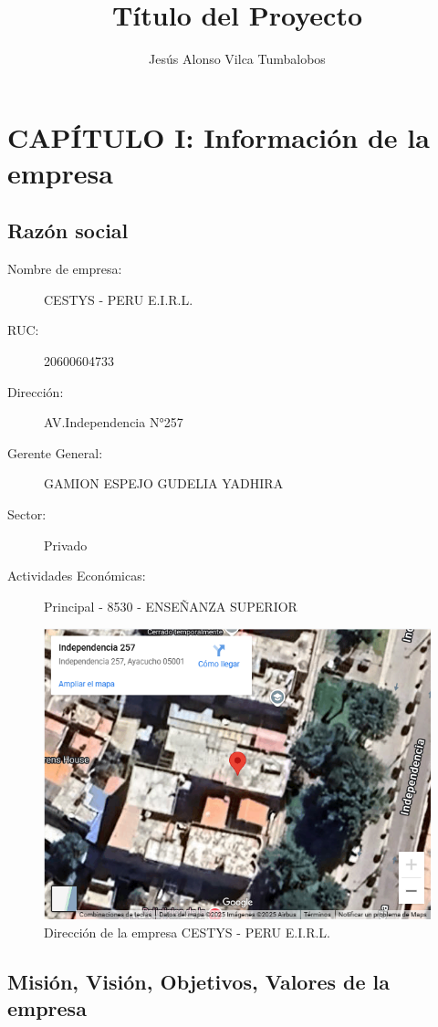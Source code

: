 \documentclass[stu, 12pt,letterpaper,donotrepeattitle,floatsintext,natbib]{apa7}
\title{Título del Proyecto}
\author{Jesús Alonso Vilca Tumbalobos}
\affiliation{Nombre de la Institución: SENATI}
\begin{document}
	
	\maketitle
	
	\tableofcontents %
	\newpage
	\section{CAPÍTULO I: Información de la empresa}
	
	\subsection{Razón social}
	
	\begin{description}
		\item[Nombre de empresa:] CESTYS - PERU E.I.R.L.
		\item[RUC:] 20600604733
		\item[Dirección:] AV.Independencia  N°257 
		\item[Gerente General:] GAMION ESPEJO GUDELIA YADHIRA
		\item[Sector:] Privado
		\item[Actividades Económicas:] Principal - 8530 - ENSEÑANZA SUPERIOR
	\end{description}
	\begin{figure}
		\centering
		\includegraphics[width=0.7\linewidth]{Figuras/11-08-08-2025-11}
		\caption{Dirección de la empresa CESTYS - PERU E.I.R.L.}
		\label{fig:11-08-08-2025-11}
	\end{figure}
	

	
	\subsection{Misión, Visión, Objetivos, Valores de la empresa}
	
\end{document}
